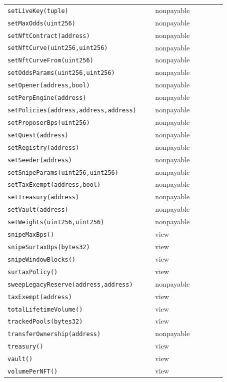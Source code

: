 \begin{longtable}{@{}p{0.62\linewidth}p{0.30\linewidth}@{}}
\texttt{\scriptsize setLiveKey(tuple)} & nonpayable \\
\texttt{\scriptsize setMaxOdds(uint256)} & nonpayable \\
\texttt{\scriptsize setNftContract(address)} & nonpayable \\
\texttt{\scriptsize setNftCurve(uint256,uint256)} & nonpayable \\
\texttt{\scriptsize setNftCurveFrom(uint256)} & nonpayable \\
\texttt{\scriptsize setOddsParams(uint256,uint256)} & nonpayable \\
\texttt{\scriptsize setOpener(address,bool)} & nonpayable \\
\texttt{\scriptsize setPerpEngine(address)} & nonpayable \\
\texttt{\scriptsize setPolicies(address,address,address)} & nonpayable \\
\texttt{\scriptsize setProposerBps(uint256)} & nonpayable \\
\texttt{\scriptsize setQuest(address)} & nonpayable \\
\texttt{\scriptsize setRegistry(address)} & nonpayable \\
\texttt{\scriptsize setSeeder(address)} & nonpayable \\
\texttt{\scriptsize setSnipeParams(uint256,uint256)} & nonpayable \\
\texttt{\scriptsize setTaxExempt(address,bool)} & nonpayable \\
\texttt{\scriptsize setTreasury(address)} & nonpayable \\
\texttt{\scriptsize setVault(address)} & nonpayable \\
\texttt{\scriptsize setWeights(uint256,uint256)} & nonpayable \\
\texttt{\scriptsize snipeMaxBps()} & view \\
\texttt{\scriptsize snipeSurtaxBps(bytes32)} & view \\
\texttt{\scriptsize snipeWindowBlocks()} & view \\
\texttt{\scriptsize surtaxPolicy()} & view \\
\texttt{\scriptsize sweepLegacyReserve(address,address)} & nonpayable \\
\texttt{\scriptsize taxExempt(address)} & view \\
\texttt{\scriptsize totalLifetimeVolume()} & view \\
\texttt{\scriptsize trackedPools(bytes32)} & view \\
\texttt{\scriptsize transferOwnership(address)} & nonpayable \\
\texttt{\scriptsize treasury()} & view \\
\texttt{\scriptsize vault()} & view \\
\texttt{\scriptsize volumePerNFT()} & view \\
\bottomrule\end{longtable}

